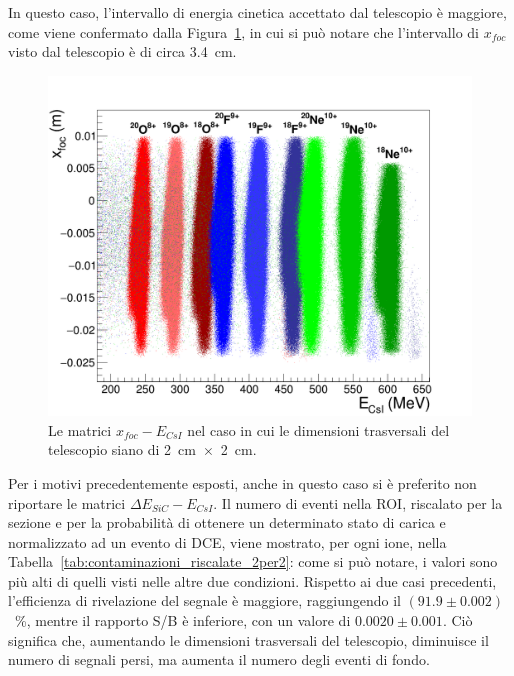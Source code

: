 In questo caso, l'intervallo di energia cinetica accettato dal telescopio è maggiore, come viene confermato dalla Figura~\ref{fig:xf_ecsi_2per2}, in cui si può notare che l'intervallo di $x_{foc}$ visto dal telescopio è di circa 3.4~cm.
\begin{figure} [!p]
	\centering
	\includegraphics[width=\textwidth, keepaspectratio]{Grafici_Tesi2/2per2/xf_ecsi_quadrata.png}
	\caption{Le matrici $x_{foc} - E_{CsI}$ nel caso in cui le dimensioni trasversali del telescopio siano di 2~cm~$\times$~2~cm.} \label{fig:xf_ecsi_2per2}
\end{figure} 
Per i motivi precedentemente esposti, anche in questo caso si è preferito non riportare le matrici $\Delta E_{SiC} - E_{CsI}$.
Il numero di eventi nella ROI, riscalato per la sezione e per la probabilità di ottenere un determinato stato di carica e normalizzato ad un evento di DCE, viene mostrato, per ogni ione, nella Tabella~\ref{tab:contaminazioni_riscalate_2per2}: come si può notare, i valori sono più alti di quelli visti nelle altre due condizioni.
Rispetto ai due casi precedenti, l'efficienza di rivelazione del segnale è maggiore, raggiungendo il $(91.9 \pm 0.002)$~\%, mentre il rapporto S/B è inferiore, con un valore di $0.0020 \pm 0.001$.
Ciò significa che, aumentando le dimensioni trasversali del telescopio, diminuisce il numero di segnali persi, ma aumenta il numero degli eventi di fondo.







